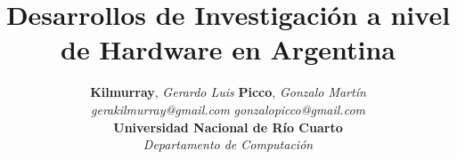 \documentclass[%
 	final,
%
	notitlepage,
	narroweqnarray,
	inline,
 	twoside,
	]{ieee}
\begin{document}
\onecolumn
\title[Hardware en Argentina]{\sffamily \textbf{Desarrollos de Investigaci\'on a nivel de Hardware en Argentina}}

\author{\textbf{Kilmurray}, \textit{Gerardo Luis} \hspace{4cm} \textbf{Picco}, \textit{Gonzalo Mart\'in}\\
        \small{\textit{gerakilmurray@gmail.com}}  \hspace{5.5cm}  \small{\textit{gonzalopicco@gmail.com}} \\ [0.5cm] 
	\large \textbf{Universidad Nacional de R\'io Cuarto}\\ \textit{Departamento de Computaci\'on}\\[1cm]
	} 




\maketitle 
\sloppy
\end{document}
